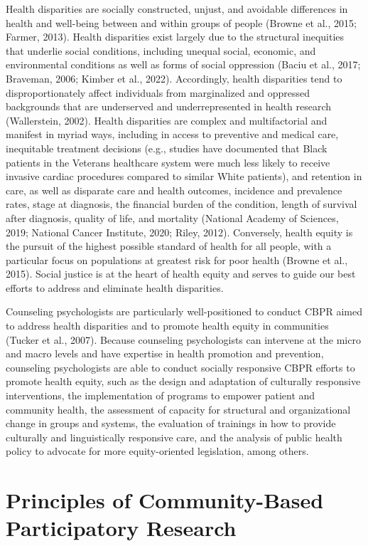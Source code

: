 \documentclass[
  11pt,
]{book}
\begin{document}
Health disparities are socially constructed, unjust, and avoidable differences in health and well-being between and within groups of people (Browne et al., 2015; Farmer, 2013). Health disparities exist largely due to the structural inequities that underlie social conditions, including unequal social, economic, and environmental conditions as well as forms of social oppression (Baciu et al., 2017; Braveman, 2006; Kimber et al., 2022). Accordingly, health disparities tend to disproportionately affect individuals from marginalized and oppressed backgrounds that are underserved and underrepresented in health research (Wallerstein, 2002). Health disparities are complex and multifactorial and manifest in myriad ways, including in access to preventive and medical care, inequitable treatment decisions (e.g., studies have documented that Black patients in the Veterans healthcare system were much less likely to receive invasive cardiac procedures compared to similar White patients), and retention in care, as well as disparate care and health outcomes, incidence and prevalence rates, stage at diagnosis, the financial burden of the condition, length of survival after diagnosis, quality of life, and mortality (National Academy of Sciences, 2019; National Cancer Institute, 2020; Riley, 2012). Conversely, health equity is the pursuit of the highest possible standard of health for all people, with a particular focus on populations at greatest risk for poor health (Browne et al., 2015). Social justice is at the heart of health equity and serves to guide our best efforts to address and eliminate health disparities.

Counseling psychologists are particularly well-positioned to conduct CBPR aimed to address health disparities and to promote health equity in communities (Tucker et al., 2007). Because counseling psychologists can intervene at the micro and macro levels and have expertise in health promotion and prevention, counseling psychologists are able to conduct socially responsive CBPR efforts to promote health equity, such as the design and adaptation of culturally responsive interventions, the implementation of programs to empower patient and community health, the assessment of capacity for structural and organizational change in groups and systems, the evaluation of trainings in how to provide culturally and linguistically responsive care, and the analysis of public health policy to advocate for more equity-oriented legislation, among others.

\section{Principles of Community-Based Participatory Research}\label{principles-of-community-based-participatory-research}
\end{document}

